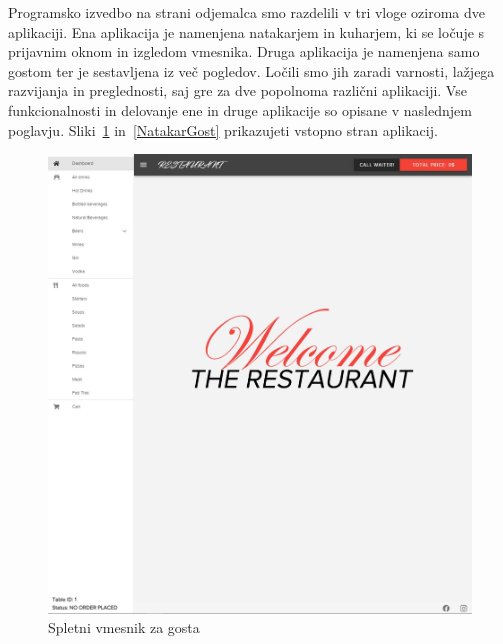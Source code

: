 \documentclass[a4paper, 12pt]{book}
\begin{document}
Programsko izvedbo na strani odjemalca smo razdelili v tri vloge oziroma dve aplikaciji. Ena aplikacija je namenjena natakarjem in kuharjem, ki se ločuje s prijavnim oknom in izgledom vmesnika. Druga aplikacija je namenjena samo gostom ter je sestavljena iz več pogledov. Ločili smo jih zaradi varnosti, lažjega razvijanja in preglednosti, saj gre za dve popolnoma različni aplikaciji. Vse funkcionalnosti in delovanje ene in druge aplikacije so opisane v naslednjem poglavju. Sliki~\ref{Gost} in~\ref{NatakarGost} prikazujeti vstopno stran aplikacij.

\begin{figure}[!htb]
\begin{center}
\includegraphics[width=12cm]{gost_1.jpg}
\caption{Spletni vmesnik za gosta}
\label{Gost}
\end{center}
\end{figure}
\end{document}
